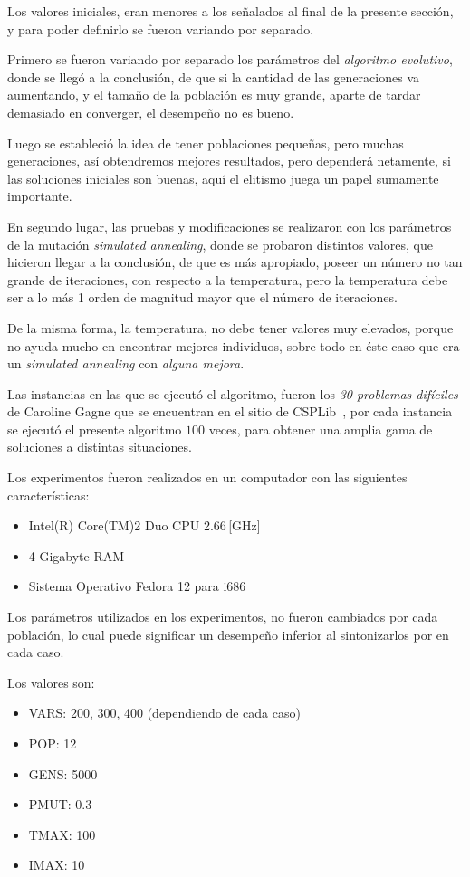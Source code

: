 
Los valores iniciales, eran menores a los señalados al final de la presente sección,
y para poder definirlo se fueron variando por separado.

Primero se fueron variando por separado los parámetros del \emph{algoritmo evolutivo},
donde se llegó a la conclusión, de que si la cantidad de las generaciones va aumentando,
y el tamaño de la población es muy grande, aparte de tardar demasiado en converger,
el desempeño no es bueno.

Luego se estableció la idea de tener poblaciones pequeñas, pero muchas generaciones,
así obtendremos mejores resultados, pero dependerá netamente, si las soluciones iniciales
son buenas, aquí el elitismo juega un papel sumamente importante.

En segundo lugar, las pruebas y modificaciones se realizaron con los parámetros de la
mutación \emph{simulated annealing}, donde se probaron distintos valores, que hicieron
llegar a la conclusión, de que es más apropiado, poseer un número no tan grande de iteraciones,
con respecto a la temperatura, pero la temperatura debe ser a lo más 1 orden de magnitud mayor
que el número de iteraciones.

De la misma forma, la temperatura, no debe tener valores muy elevados, porque no ayuda mucho
en encontrar mejores individuos, sobre todo en éste caso que era un \emph{simulated annealing}
con \emph{alguna mejora}.

Las instancias en las que se ejecutó el algoritmo, fueron los \emph{30 problemas difíciles} de
Caroline Gagne que se encuentran en el sitio de CSPLib~\cite{gagne}, por cada instancia se ejecutó
el presente algoritmo $100$ veces, para obtener una amplia gama de soluciones a distintas situaciones.

Los experimentos fueron realizados en un computador con las siguientes características:
\begin{itemize}
	\item Intel(R) Core(TM)2 Duo CPU 2.66\,[GHz]
	\item 4 Gigabyte RAM
	\item Sistema Operativo Fedora 12 para i686
\end{itemize}

Los parámetros utilizados en los experimentos, no fueron cambiados por cada población,
lo cual puede significar un desempeño inferior al sintonizarlos por en cada caso.

Los valores son:
\begin{itemize}
	\item VARS: 200, 300, 400 (dependiendo de cada caso)
	\item POP: 12
	\item GENS: 5000
	\item PMUT: 0.3
	\item TMAX: 100
	\item IMAX: 10
\end{itemize}
